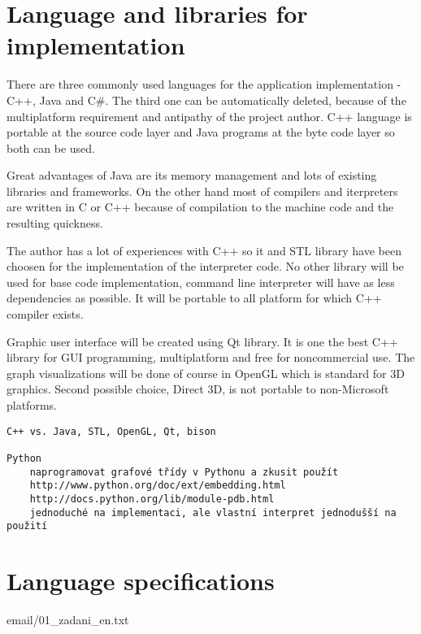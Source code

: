 \documentclass[11pt,twoside,a4paper]{book}
\begin{document}
\section{Language and libraries for implementation}

There are three commonly used languages for the application implementation - C++, Java and C\#. The third one can be automatically deleted, because of the multiplatform requirement and antipathy of the project author. C++ language is portable at the source code layer and Java programs at the byte code layer so both can be used.

Great advantages of Java are its memory management and lots of existing libraries and frameworks. On the other hand most of compilers and iterpreters are written in C or C++ because of compilation to the machine code and the resulting quickness.

The author has a lot of experiences with C++ so it and STL library have been choosen for the implementation of the interpreter code. No other library will be used for base code implementation, command line interpreter will have as less dependencies as possible. It will be portable to all platform for which C++ compiler exists.

Graphic user interface will be created using Qt library. It is one the best C++ library for GUI programming, multiplatform and free for noncommercial use. The graph visualizations will be done of course in OpenGL which is standard for 3D graphics. Second possible choice, Direct 3D, is not portable to non-Microsoft platforms.

\begin{verbatim}
C++ vs. Java, STL, OpenGL, Qt, bison

Python
	naprogramovat grafové třídy v Pythonu a zkusit použít
	http://www.python.org/doc/ext/embedding.html
	http://docs.python.org/lib/module-pdb.html
	jednoduché na implementaci, ale vlastní interpret jednodušší na použití
\end{verbatim}


\section{Language specifications}

email/01\_zadani\_en.txt
\end{document}
